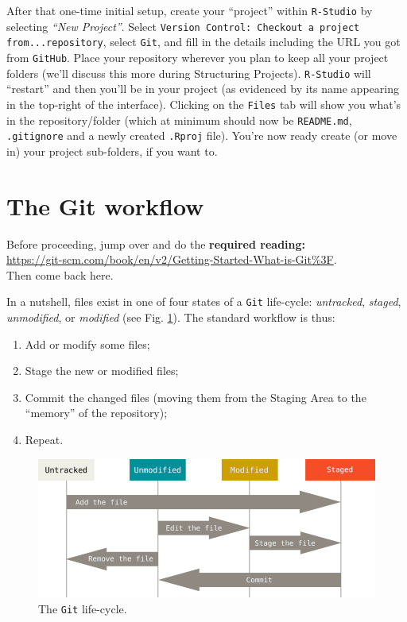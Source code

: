 \documentclass[12pt,letterpaper]{article}
\begin{document}
After that one-time initial setup,
create your ``project'' within  \texttt{R-Studio} by selecting \textit{``New Project''}.
Select \texttt{Version Control: Checkout a project from...repository}, 
select \texttt{Git}, 
and fill in the details including the URL you got from \texttt{GitHub}.
Place your repository wherever you plan to keep all your project folders 
(we'll discuss this more during Structuring Projects).
\texttt{R-Studio} will ``restart'' and then you'll be in your project
(as evidenced by its name appearing in the top-right of the interface).
Clicking on the \texttt{Files} tab will show you what's in the repository/folder
(which at minimum should now be
\texttt{README.md}, \texttt{.gitignore} and a newly created \texttt{.Rproj} file).
You're now ready create (or move in) your project sub-folders, if you want to.




\section{The Git workflow}
Before proceeding, jump over and do the \textbf{required reading:}\\
\url{https://git-scm.com/book/en/v2/Getting-Started-What-is-Git%3F}.\\
Then come back here.

In a nutshell, 
files exist in one of four states of a \texttt{Git} life-cycle: 
\emph{untracked}, \emph{staged}, \emph{unmodified}, or \emph{modified}
(see Fig. \ref{fig:lifecycle}).
The standard workflow is thus:
\begin{enumerate}
	\item Add or modify some files;
	\item Stage the new or modified files;
	\item Commit the changed files
	(moving them from the Staging Area to the ``memory'' of the repository);
	\item Repeat.
\end{enumerate}

\begin{figure}
	\includegraphics[width=\linewidth]{figs/lifecycle}
	\caption{The \texttt{Git} life-cycle.}
	\label{fig:lifecycle}
\end{figure}
\end{document}
